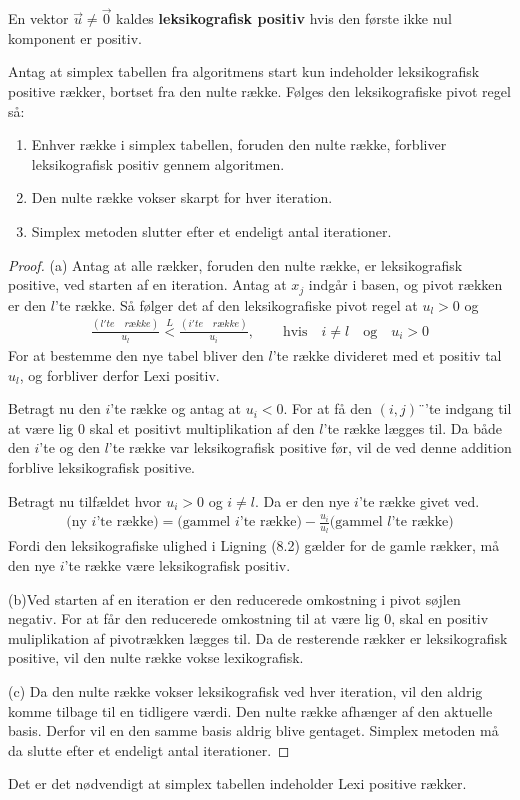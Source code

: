 \begin{defn}
En vektor $\vec{u} \neq \vec{0}$ kaldes \textbf{leksikografisk positiv} hvis den første ikke nul komponent er positiv. 
\end{defn}

 
\begin{stn}
Antag at simplex tabellen fra algoritmens start kun indeholder leksikografisk positive rækker, bortset fra den nulte række. Følges den leksikografiske pivot regel så: 
\begin{enumerate}[label=(\alph*)]
\item Enhver række i simplex tabellen, foruden den nulte række, forbliver leksikografisk positiv gennem algoritmen. 
\item Den nulte række vokser skarpt for hver iteration. 
\item Simplex metoden slutter efter et endeligt antal iterationer. 
\end{enumerate}
\label{stn:lexi}
\end{stn}

\begin{proof}
(a) Antag at alle rækker, foruden den nulte række, er leksikografisk positive, ved starten af en iteration. Antag at $x_j$ indgår i basen, og pivot rækken er den $l$'te række. Så følger det af den leksikografiske pivot regel at $u_l>0$ og
\begin{align}
\frac{(l'te \quad række)}{u_l} \overset{L}{<} \frac{(i'te \quad række)}{u_i}, \quad \quad \text{hvis} \quad  i \neq l \quad \text{og} \quad u_i>0
\end{align}
For at bestemme den nye tabel bliver den $l$'te række divideret med et positiv tal $u_l$, og forbliver derfor Lexi positiv. 

Betragt nu den $i$'te række og antag at $u_i<0$. For at få den $(i,j)$¨'te indgang til at være lig $0$ skal et positivt multiplikation af den $l$'te række lægges til. Da både den $i$'te og den $l$'te række var leksikografisk positive før, vil de ved denne addition forblive leksikografisk positive.

Betragt nu tilfældet hvor $u_i>0$ og $i \neq l$. Da er den nye $i$'te række givet ved. 
\begin{align*}
(\text{ny $i$'te række)}=\text{(gammel $i$'te række)}-\frac{u_i}{u_l}\text{(gammel $l$'te række)}
\end{align*}  
Fordi den leksikografiske ulighed i Ligning (8.2) gælder for de gamle rækker, må den nye $i$'te række være leksikografisk positiv. 

(b)Ved starten af en iteration er den reducerede omkostning i pivot søjlen negativ. For at får den reducerede omkostning til at være lig $0$, skal en positiv muliplikation af pivotrækken lægges til. Da de resterende rækker er leksikografisk positive, vil den nulte række vokse lexikografisk. 


(c) Da den nulte række vokser leksikografisk ved hver iteration, vil den aldrig komme tilbage til en tidligere værdi. Den nulte række afhænger af den aktuelle basis. Derfor vil en den samme basis aldrig blive gentaget. Simplex metoden må da slutte efter et endeligt antal iterationer. 
\end{proof}

Det er det nødvendigt at simplex tabellen indeholder Lexi positive rækker. 